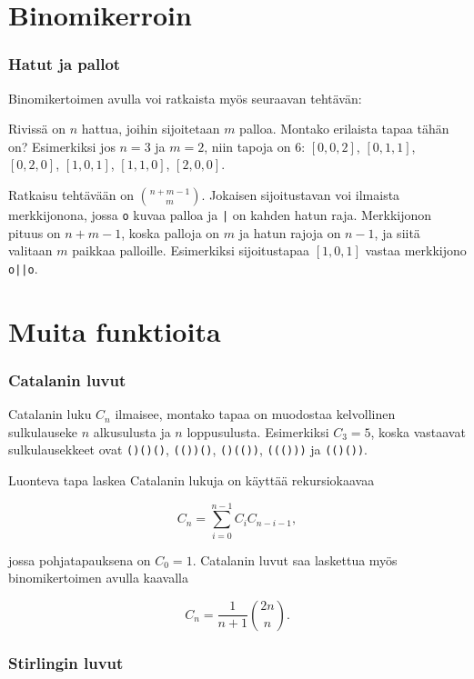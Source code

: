 \section{Binomikerroin}

\subsubsection*{Hatut ja pallot}

Binomikertoimen avulla voi ratkaista myös seuraavan tehtävän:

\begin{task}
Rivissä on $n$ hattua, joihin sijoitetaan $m$ palloa.
Montako erilaista tapaa tähän on?
Esimerkiksi jos $n=3$ ja $m=2$, niin tapoja on 6:
$[0,0,2]$, $[0,1,1]$, $[0,2,0]$, $[1,0,1]$, $[1,1,0]$,
$[2,0,0]$.
\end{task}

\noindent
Ratkaisu tehtävään on ${n+m-1 \choose m}$.
Jokaisen sijoitustavan voi ilmaista merkkijonona, jossa \texttt{o}
kuvaa palloa ja \texttt{|} on kahden hatun raja.
Merkkijonon pituus on $n+m-1$, koska palloja on $m$
ja hatun rajoja on $n-1$,
ja siitä valitaan $m$ paikkaa palloille.
Esimerkiksi sijoitustapaa $[1,0,1]$
vastaa merkkijono \texttt{o||o}.

\section{Muita funktioita}

\subsubsection*{Catalanin luvut}

Catalanin luku $C_n$ ilmaisee,
montako tapaa on muodostaa kelvollinen sulkulauseke
$n$ alkusulusta ja $n$ loppusulusta.
Esimerkiksi $C_3=5$, koska vastaavat sulkulausekkeet
ovat \texttt{()()()}, \texttt{(())()},
\texttt{()(())}, \texttt{((()))} ja \texttt{(()())}.

Luonteva tapa laskea Catalanin lukuja
on käyttää rekursiokaavaa

\[ C_n = \sum_{i=0}^{n-1} C_i C_{n-i-1}, \]

jossa pohjatapauksena on $C_0=1$.
Catalanin luvut saa laskettua myös binomikertoimen avulla kaavalla

\[ C_n = \frac{1}{n+1} {2n \choose n}. \]

\subsubsection*{Stirlingin luvut}

